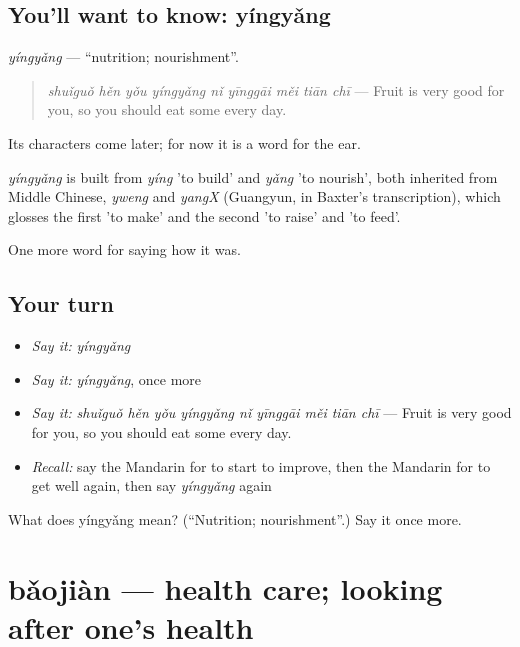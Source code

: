 \subsection*{You'll want to know: yíngyǎng}
\emph{yíngyǎng} — \textquotedblleft{}nutrition; nourishment\textquotedblright{}.

\begin{quote}
\emph{shuǐguǒ hěn yǒu yíngyǎng nǐ yīnggāi měi tiān chī} — Fruit is very good for you, so you should eat some every day.
\end{quote}

Its characters come later; for now it is a word for the ear.

\begin{cousinweb}
\emph{yíngyǎng} is built from \emph{yíng} 'to build' and \emph{yǎng} 'to nourish', both inherited from Middle Chinese, \emph{yweng} and \emph{yangX} (Guangyun, in Baxter's transcription), which glosses the first 'to make' and the second 'to raise' and 'to feed'.
\end{cousinweb}

\begin{grammarlens}[title={What you've built}]
One more word for saying how it was.
\end{grammarlens}

\subsection*{Your turn}
\begin{itemize}
\raggedright
  \item \emph{Say it:} \emph{yíngyǎng}
  \item \emph{Say it:} \emph{yíngyǎng}, once more
  \item \emph{Say it:} \emph{shuǐguǒ hěn yǒu yíngyǎng nǐ yīnggāi měi tiān chī} — Fruit is very good for you, so you should eat some every day.
  \item \emph{Recall:} say the Mandarin for to start to improve, then the Mandarin for to get well again, then say \emph{yíngyǎng} again
\end{itemize}

\begin{tcolorbox}[breakable,colback=teal!4,colframe=teal!35!black,title={Before you move on}]
What does yíngyǎng mean? (\textquotedblleft{}Nutrition; nourishment\textquotedblright{}.) Say it once more.
\end{tcolorbox}
\section[bǎojiàn]{bǎojiàn — health care; looking after one's health}

